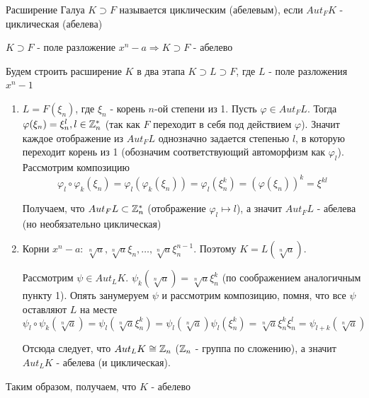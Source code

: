 \par \Def Расширение Галуа $K \supset F$ называется циклическим (абелевым), если $Aut_F K$ - циклическая (абелева)

\par \Statement $K \supset F$ - поле разложение $x^n-a \Rightarrow K \supset F$ - абелево

\par \Proof Будем строить расширение $K$ в два этапа $K \supset L \supset F$, где $L$ - поле разложения $x^n-1$
\begin{enumerate}
    \item $L=F(\xi_n)$, где $\xi_n$ - корень $n$-ой степени из 1. Пусть $\varphi \in Aut_F L$. Тогда $\varphi(\xi_n)=\xi_n^l, l \in \mathbb{Z}_n^*$ (так как $F$ переходит в себя под действием $\varphi$). Значит каждое отображение из $Aut_F L$ однозначно задается степенью $l$, в которую переходит корень из 1 (обозначим соответствующий автоморфизм как $\varphi_l$). Рассмотрим композицию
    $$\varphi_l \circ \varphi_k(\xi_n) = \varphi_l(\varphi_k(\xi_n))=\varphi_l(\xi_n^k)=(\varphi(\xi_n))^k=\xi^{kl}$$
    \par Получаем, что $Aut_F L \subset \mathbb{Z}_n^*$ (отображение $\varphi_l \mapsto l$), а значит $Aut_F L$ - абелева (но необязательно циклическая)
    
    \item Корни $x^n-a$: $\sqrt[n]{a}, \sqrt[n]{a}\xi_n, \ldots, \sqrt[n]{a}\xi_n^{n-1}$. Поэтому $K=L(\sqrt[n]{a})$.
    \par Рассмотрим $\psi \in Aut_L K$. $\psi_k(\sqrt[n]{a})=\sqrt[n]{a} \xi_n^k$ (по соображением аналогичным пункту 1). Опять занумеруем $\psi$ и рассмотрим композицию, помня, что все $\psi$ оставляют $L$ на месте
    $$\psi_l \circ \psi_k(\sqrt[n]{a})=\psi_l(\sqrt[n]{a} \xi_n^k)=\psi_l(\sqrt[n]{a})\psi_l(\xi_n^k)=\sqrt[n]{a}\xi_n^k \xi_n^l=\psi_{l+k}(\sqrt[n]{a})$$
    \par Отсюда следует, что $Aut_L K \cong \mathbb{Z}_n$ ($\mathbb{Z}_n$ - группа по сложению), а значит $Aut_L K$ - абелева (и циклическая).
\end{enumerate}
\par Таким образом, получаем, что $K$ - абелево \EndProof